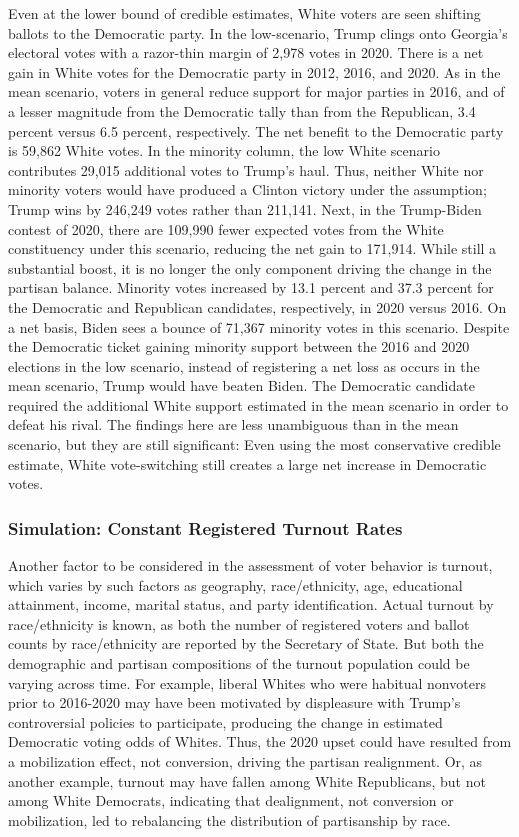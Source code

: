 Even at the lower bound of credible estimates, White voters are seen shifting ballots to the Democratic party. In the low-scenario, Trump clings onto Georgia's electoral votes with a razor-thin margin of 2,978 votes in 2020. There is a net gain in White votes for the Democratic party in 2012, 2016, and 2020. As in the mean scenario, voters in general reduce support for major parties in 2016, and of a lesser magnitude from the Democratic tally than from the Republican, 3.4 percent versus 6.5 percent, respectively. The net benefit to the Democratic party is 59,862 White votes. In the minority column, the low White scenario contributes 29,015 additional votes to Trump's haul. Thus, neither White nor minority voters would have produced a Clinton victory under the assumption; Trump wins by 246,249 votes rather than 211,141. Next, in the Trump-Biden contest of 2020, there are 109,990 fewer expected votes from the White constituency under this scenario, reducing the net gain to 171,914. While still a substantial boost, it is no longer the only component driving the change in the partisan balance. Minority votes increased by 13.1 percent and 37.3 percent for the Democratic and Republican candidates, respectively, in 2020 versus 2016. On a net basis, Biden sees a bounce of 71,367 minority votes in this scenario. Despite the Democratic ticket gaining minority support between the 2016 and 2020 elections in the low scenario, instead of registering a net loss as occurs in the mean scenario, Trump would have beaten Biden. The Democratic candidate required the additional White support estimated in the mean scenario in order to defeat his rival. The findings here are less unambiguous than in the mean scenario, but they are still significant: Even using the most conservative credible estimate, White vote-switching still creates a large net increase in Democratic votes.   

\subsubsection{Simulation: Constant Registered Turnout Rates}


Another factor to be considered in the assessment of voter behavior is turnout, which varies by such factors as geography, race/ethnicity, age, educational attainment, income, marital status, and party identification. Actual turnout by race/ethnicity is known, as both the number of registered voters and ballot counts by race/ethnicity are reported by the Secretary of State. But both the demographic and partisan compositions of the turnout population could be varying across time. For example, liberal Whites who were habitual nonvoters prior to 2016-2020 may have been motivated by displeasure with Trump's controversial policies to participate, producing the change in estimated Democratic voting odds of Whites. Thus, the 2020 upset could have resulted from a mobilization effect, not conversion, driving the partisan realignment. Or, as another example, turnout may have fallen among White Republicans, but not among White Democrats, indicating that dealignment, not conversion or mobilization, led to rebalancing the distribution of partisanship by race. 



